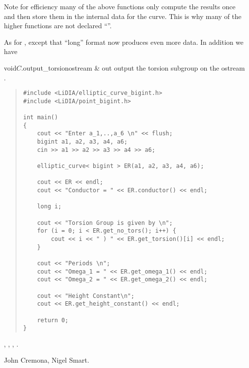 Note for efficiency many of the above functions only compute the results once and then store
them in the internal data for the curve.  This is why many of the higher functions are not
declared ``''.



\IO

As for , except that ``long'' format now produces even more data.  In
addition we have

\begin{fcode}{void}{$C$.output_torsion}{ostream & out}
  output the torsion subgroup on the ostream .
\end{fcode}



\EXAMPLES

\begin{quote}
\begin{verbatim}
#include <LiDIA/elliptic_curve_bigint.h>
#include <LiDIA/point_bigint.h>

int main()
{
    cout << "Enter a_1,..,a_6 \n" << flush;
    bigint a1, a2, a3, a4, a6;
    cin >> a1 >> a2 >> a3 >> a4 >> a6;

    elliptic_curve< bigint > ER(a1, a2, a3, a4, a6);

    cout << ER << endl;
    cout << "Conductor = " << ER.conductor() << endl;

    long i;

    cout << "Torsion Group is given by \n";
    for (i = 0; i < ER.get_no_tors(); i++) { 
        cout << i << " ) " << ER.get_torsion()[i] << endl;
    }

    cout << "Periods \n";
    cout << "Omega_1 = " << ER.get_omega_1() << endl;
    cout << "Omega_2 = " << ER.get_omega_2() << endl;

    cout << "Height Constant\n";
    cout << ER.get_height_constant() << endl;

    return 0;
}

\end{verbatim}
\end{quote}



\SEEALSO

,
,
,
.



\AUTHOR

John Cremona, Nigel Smart.
